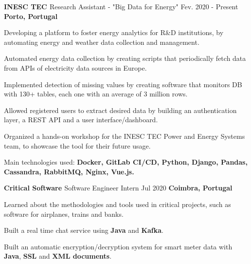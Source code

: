 

\begin{cventries}

  \cventry
    {\textbf{INESC TEC \href{https://www.inesctec.pt/en}{\faExternalLink}}} %
    {Research Assistant - "Big Data for Energy"} %
    {Fev. 2020 - Present} %
    {\textbf{Porto, Portugal}} %
    {
      \begin{cvitems} %
        \item {Developing a platform to foster energy analytics for R\&D institutions, by automating energy and weather data collection and management.}
        \item {Automated energy data collection by creating scripts that periodically fetch data from APIs of electricity data sources in Europe.}
        \item {Implemented detection of missing values by creating software that monitors DB with 130+ tables, each one with an average of 3 million rows.}
        \item {Allowed registered users to extract desired data by building an authentication layer, a REST API and a user interface/dashboard.}
        \item {Organized a hands-on workshop for the INESC TEC Power and Energy Systems team, to showcase the tool for their future usage.}
        \item {Main technologies used: \textbf{Docker, GitLab CI/CD, Python, Django, Pandas, Cassandra, RabbitMQ, Nginx, Vue.js.}}
      \end{cvitems}
    }

  \cventry
    {\textbf{Critical Software \href{https://www.criticalsoftware.com/en}{\faExternalLink}}} %
    {Software Engineer Intern} %
    {Jul 2020} %
    {\textbf{Coimbra, Portugal}} %
    {
      \begin{cvitems} %
        \item {Learned about the methodologies and tools used in critical projects, such as software for airplanes, trains and banks.}
        \item {Built a real time chat service using \textbf{Java} and \textbf{Kafka}.}
        \item {Built an automatic encryption/decryption system for smart meter data with \textbf{Java}, \textbf{SSL} and \textbf{XML documents}.}
      \end{cvitems}
    }
    

\end{cventries}
